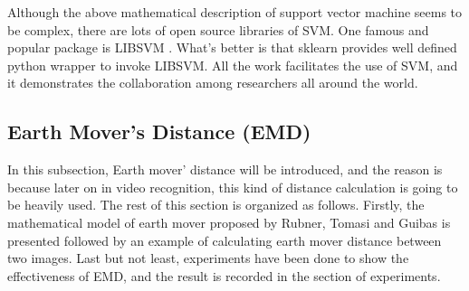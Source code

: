     \begin{table}[!ht]
        \begin{center}
        \end{center}
        \caption{Kernel functions}
    \end{table}

  \noindent Although the above mathematical description of support vector machine seems to be complex, there are lots of open source libraries of SVM. One famous and popular package is LIBSVM \cite{CC01a}. What's better is that sklearn \cite{scikit-learn} provides well defined python wrapper to invoke LIBSVM. All the work facilitates the use of SVM, and it demonstrates the collaboration among researchers all around the world.

\subsection{Earth Mover's Distance (EMD)}
In this subsection, Earth mover' distance will be introduced, and the reason is because later on in video recognition, this kind of distance calculation is going to be heavily used. The rest of this section is organized as follows. Firstly, the mathematical model of earth mover proposed by Rubner, Tomasi and Guibas \cite{rubner2000earth} is presented followed by an example of calculating earth mover distance between two images. Last but not least, experiments have been done to show the effectiveness of EMD, and the result is recorded in the section of experiments.\\

